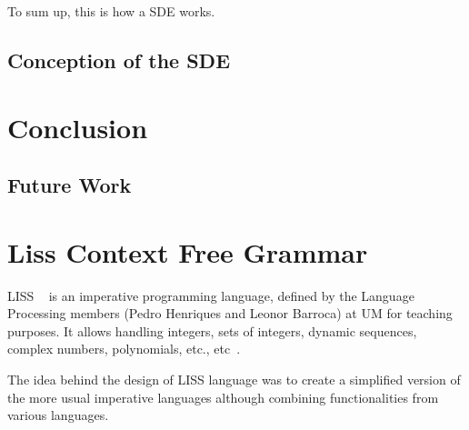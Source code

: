 \documentclass[
  oneside,
  11pt, a4paper,
  footinclude=true,
  headinclude=true,
  cleardoublepage=empty
]{scrbook}
\begin{document}
To sum up, this is how a SDE works.

\section{Conception of the SDE}


\chapter{Conclusion}
\section{Future Work}


	

	
	
	
	\chapter{Liss Context Free Grammar}

	LISS ~\citep{CH07a} is an imperative programming language, defined by the Language Processing members (Pedro Henriques and Leonor Barroca) at UM for teaching purposes.
	It allows handling integers, sets of integers, dynamic sequences, complex numbers, polynomials, etc., etc~\citep{CH07d,CH07a,CH06a,CH06b,CH05a}.

	The idea behind the design of LISS language was to create a simplified version of the more usual imperative languages although combining functionalities from various languages.

	
\end{document}

